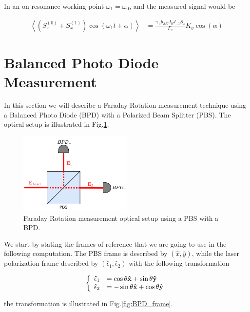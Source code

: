 \documentclass{article}
\begin{document}
In an on resonance working point $\omega_1=\omega_0$, and the measured signal would be

\begin{align}
      \left<\left(S_x^{(0)}+S_x^{(1)}\right)\cos{\left(\omega_1 t+\alpha\right)}\right> &= \frac{\gamma_{A}b_{SK}J_{0}J_{-1} S_z}{\Gamma_2} K_y \cos{(\alpha)}
\end{align}

\newpage
\section{Balanced Photo Diode Measurement}
In this section we will describe a Faraday Rotation measurement technique using a Balanced Photo Diode (BPD) with a Polarized Beam Splitter (PBS). The optical setup is illustrated in Fig.\ref{fig:BPD_scheme}. 

\begin{figure}
\centering
\includegraphics[width=0.5\textwidth]{Theory/Figures/BPD_scheme.png}
\caption{Faraday Rotation measurement optical setup using a PBS with a BPD.}
\label{fig:BPD_scheme}
\end{figure}

We start by stating the frames of reference that we are going to use in the following computation. The PBS frame is described by $(\hat{x}, \hat{y})$, while the laser polarization frame described by $(\hat{\epsilon}_1, \hat{\epsilon}_2)$ with the following transformation 

\begin{align}
    \left\{ 
  \begin{array}{ c l }
    \mathbf{\hat{\epsilon}}_1 &= \cos{\theta}\mathbf{\hat{x}}+\sin{\theta}\mathbf{\hat{y}} \\
    \mathbf{\hat{\epsilon}}_2 &= -\sin{\theta}\mathbf{\hat{x}}+\cos{\theta}\mathbf{\hat{y}}
  \end{array}
 \right.\label{laser_PBS_transformation}
\end{align}

the transformation is illustrated in Fig.\ref{fig:BPD_frame}.
\end{document}
